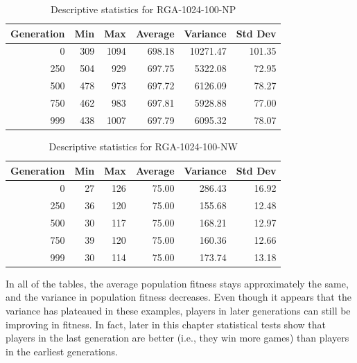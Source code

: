 \begin{table}[ht]
\begin{center}
\caption[RGA-1024-100-NP statistics]{Descriptive statistics for RGA-1024-100-NP}
\begin{tabular}{ | r || r | r | r | r | r |}
\hline
Generation & Min & Max & Average & Variance & Std Dev \\ \hline \hline
0   & 309 & 1094 & 698.18 &  10271.47 & 101.35 \\ 
250 & 504 &  929 & 697.75 &   5322.08 &  72.95 \\ 
500 & 478 &  973 & 697.72 &   6126.09 &  78.27 \\ 
750 & 462 &  983 & 697.81 &   5928.88 &  77.00 \\ 
999 & 438 & 1007 & 697.79 &   6095.32 &  78.07 \\ \hline
\end{tabular}
\label{table-stats-for-s1024-n100-np}
\end{center}
\end{table}

\begin{table}[ht]
\begin{center}
\caption[RGA-1024-100-NW statistics]{Descriptive statistics for RGA-1024-100-NW}
\begin{tabular}{ | r || r | r | r | r | r |}
\hline
Generation & Min & Max & Average & Variance & Std Dev \\ \hline \hline
0   & 27 & 126 & 75.00 & 286.43 & 16.92 \\ 
250 & 36 & 120 & 75.00 & 155.68 & 12.48 \\ 
500 & 30 & 117 & 75.00 & 168.21 & 12.97 \\ 
750 & 39 & 120 & 75.00 & 160.36 & 12.66 \\ 
999 & 30 & 114 & 75.00 & 173.74 & 13.18 \\ \hline
\end{tabular}
\label{table-stats-for-s1024-n100-nw}
\end{center}
\end{table}

In all of the tables, the average population fitness stays approximately
the same, and the variance in population fitness decreases. Even though it
appears that the variance has plateaued in these examples, players in later
generations can still be improving in fitness. In fact, 
later in this chapter statistical tests show that players in the last generation
are better (i.e., they win more games) than players in the earliest generations.

